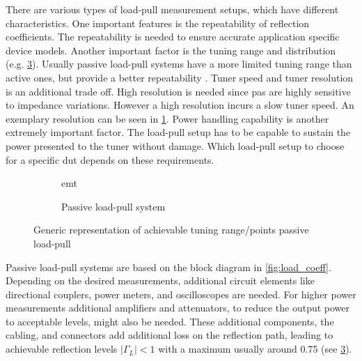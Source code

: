 \documentclass[12pt,a4paper,parskip=full,abstract=true,BCOR=10mm,twoside,open=right]{scrreprt}
\providecommand{\abs}[1]{\lvert#1\rvert}
\begin{document}
There are various types of load-pull measurement setups, which have different
characteristics. One important features is the repeatability of reflection
coefficients. The repeatability is needed to ensure accurate application
specific device models. Another important factor is the tuning range and
distribution (e.g. \cref{fig:range_passive}). Usually passive load-pull
systems have a more limited tuning range than active ones, but provide a
better repeatability \cite{ghannouchi_load-pull_2013}. Tuner speed and tuner
resolution is an additional trade off. High resolution is needed since \glspl{pa} are
highly sensitive to impedance variations. However a high resolution incurs
a slow tuner speed. An exemplary resolution can be seen in \cref{fig:generic_emt}.
Power handling capability is another extremely important factor. The load-pull
setup has to be capable to sustain the power presented to the tuner without
damage. Which load-pull setup to choose for a specific \gls{dut} depends on
these requirements.

\begin{figure}[htb]
    \begin{subfigure}[b]{.5\linewidth}
        \centering
        \caption{\Gls{emt}}
        \label{fig:generic_emt}
    \end{subfigure}%
    \begin{subfigure}[b]{.5\linewidth}
        \centering
        \caption{Passive load-pull system}
        \label{fig:range_passive}
    \end{subfigure}
    \caption{Generic representation of achievable tuning range/points passive load-pull}
\end{figure}

Passive load-pull systems are based on the block diagram in \cref{fig:load_coeff}. Depending on
the desired measurements, additional circuit elements like directional couplers,
power meters, and oscilloscopes are needed. For higher power measurements additional
amplifiers and attenuators, to reduce the output power to acceptable levels, might also
be needed. These additional components, the cabling, and connectors add additional loss
on the reflection path, leading to achievable reflection levels $\abs{\Gamma_L} < 1$ with
a maximum usually around 0.75 \cite{de_groote_introduction_2008} (see \cref{fig:range_passive}).
\end{document}
